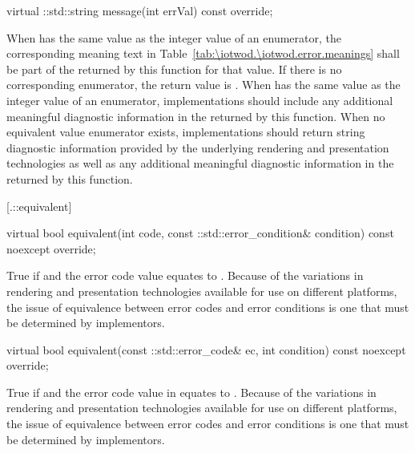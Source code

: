 %
%
\begin{itemdecl}
virtual ::std::string message(int errVal) const override;
\end{itemdecl}
\begin{itemdescr}
	\pnum
	\returns
	When  has the same value as the integer value of an 
	 enumerator, the corresponding meaning text in 
	Table~\ref{tab:\iotwod.\iotwod.error.meanings} shall be part of the 
	 returned by this function for that value. If there is no 
	corresponding enumerator, the return value is 
	.
	\enternote
	When  has the same value as the integer value of an 
	 enumerator, implementations should include any 
	additional meaningful diagnostic information in the  returned 
	by this function. When no equivalent value enumerator exists, 
	implementations should return string diagnostic information provided by the 
	underlying rendering and presentation technologies as well as any 
	additional meaningful diagnostic information in the  returned 
	by this function.
	\exitnote
	
\end{itemdescr}

 [\iotwod.\iotwoderrorcategory::equivalent] 
{}

%
%
\begin{itemdecl}
virtual bool equivalent(int code,
  const ::std::error_condition& condition) const noexcept override;
\end{itemdecl}
\begin{itemdescr}
	\pnum
	\returns
	True if  and the  error code value  equates to .
	\enternote
	Because of the variations in rendering and presentation technologies 
	available for use on different platforms, the issue of equivalence between 
	error codes and error conditions is one that must be determined by 
	implementors.
	\exitnote
\end{itemdescr}
\begin{itemdecl}
virtual bool equivalent(const ::std::error_code& ec,
  int condition) const noexcept override;
\end{itemdecl}
\begin{itemdescr}
	\pnum
	\returns
	True if  and the  error code value in  equates to .
	\enternote
	Because of the variations in rendering and presentation technologies 
	available for use on different platforms, the issue of equivalence between 
	error codes and error conditions is one that must be determined by 
	implementors.
	\exitnote
\end{itemdescr}

